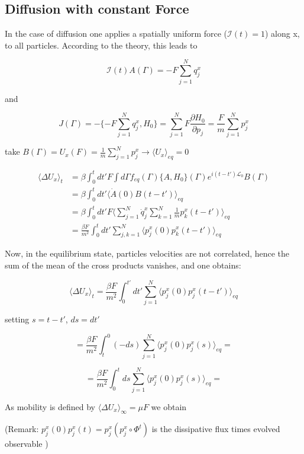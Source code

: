 \documentclass{article}
\begin{document}
\subsection{Diffusion with constant Force}

In the case of diffusion one applies a spatially uniform force ($\mathcal{I}(t)=1$) along x, to all particles. According to the theory, this leads to

$$ \mathcal{I}(t) A(\Gamma) = -F \sum_{j=1}^{N} q^x_j$$

and

$$ J(\Gamma) = - \{ -F  \sum_{j=1}^{N} q^x_j , H_0 \} = \sum_{j=1}^{N} F \frac{\partial H_0}{\partial p_j} = \frac{F}{m} \sum_{j=1}^{N} p^x_j $$


take $B(\Gamma) = U_x(F) = \frac{1}{m}  \sum_{j=1}^{N} p^x_j \rightarrow \langle U_x \rangle_{eq} = 0 $

\begin{align*}
 \langle \Delta U_x \rangle_t & = \beta \int_{0}^{t} dt' F \int d \Gamma f_{eq}(\Gamma) \{ A, H_0 \}(\Gamma ) e^{i(t-t')\mathcal{L}_0} B(\Gamma) \\
 & = \beta \int_{0}^{t} dt' \langle \dot{A}(0) B(t-t') \rangle_{eq} \\
 & = \beta \int_{0}^{t} dt'F \langle  \sum_{j=1}^{N} \dot{q}^x_j \sum_{k=1}^{N} \frac{1}{m} p^x_k(t-t')\rangle_{eq} \\
 & = \frac{\beta F}{ m^2} \int_{0}^{t} dt' \sum_{j,k=1}^{N} \langle p^x_j(0) p^x_k(t-t')\rangle_{eq}
\end{align*}

Now, in the equilibrium state, particles velocities are not correlated, hence the sum of the mean of the cross products vanishes, and one obtains:

\begin{equation}
 \langle \Delta U_x \rangle_t =  \frac{\beta F}{ m^2} \int_{0}^{t'} dt' \sum_{j=1}^{N} \langle p^x_j(0) p^x_j(t-t')  \rangle_{eq}
\end{equation}

setting $s = t -t'$, $ds = dt'$

$$ = \frac{\beta F}{ m^2} \int_{t}^{0} (- ds)  \sum_{j=1}^{N} \langle p^x_j(0) p^x_j(s)  \rangle_{eq} = $$

$$  =  \frac{\beta F}{ m^2} \int_{0}^{t} ds  \sum_{j=1}^{N} \langle p^x_j(0) p^x_j(s)  \rangle_{eq} = $$

As mobility is defined by $  \langle \Delta U_x \rangle_{\infty} = \mu F $ we obtain

(Remark: $p^x_j(0) p^x_j(t) =  p^x_j (p^x_j \circ \Phi^t )$ is the dissipative flux times evolved observable )
\end{document}
